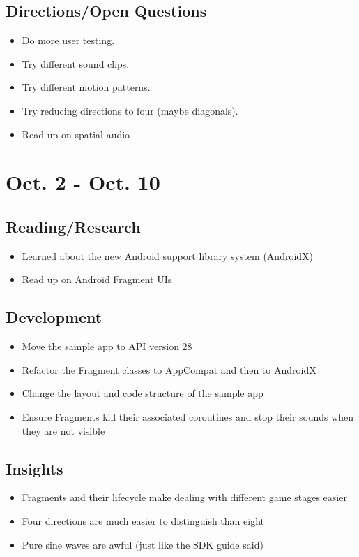 \documentclass{article}
\begin{document}
\subsection{Directions/Open Questions}
\begin{itemize}
    \item Do more user testing.
    \item Try different sound clips.
    \item Try different motion patterns.
    \item Try reducing directions to four (maybe diagonals).
    \item Read up on spatial audio
\end{itemize}
\section{Oct. 2 - Oct. 10}
\subsection{Reading/Research}
\begin{itemize}
    \item Learned about the new Android support library system (AndroidX)
    \item Read up on Android Fragment UIs
\end{itemize}
\subsection{Development}
\begin{itemize}
    \item Move the sample app to API version 28
    \item Refactor the Fragment classes to AppCompat and then to AndroidX
    \item Change the layout and code structure of the sample app
    \item Ensure Fragments kill their associated coroutines and stop their sounds when they are not visible
\end{itemize}
\subsection{Insights}
\begin{itemize}
    \item Fragments and their lifecycle make dealing with different game stages easier
    \item Four directions are much easier to distinguish than eight
    \item Pure sine waves are awful (just like the SDK guide said)
\end{itemize}
\end{document}
